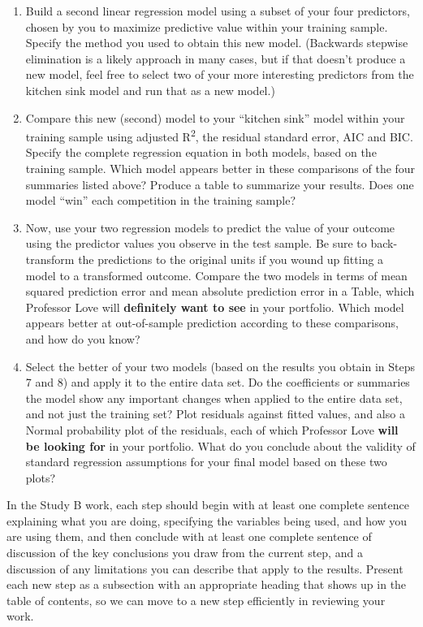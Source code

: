 \documentclass[]{book}
\begin{document}
\begin{enumerate}
\item
  Build a second linear regression model using a subset of your four predictors, chosen by you to maximize predictive value within your training sample. Specify the method you used to obtain this new model. (Backwards stepwise elimination is a likely approach in many cases, but if that doesn't produce a new model, feel free to select two of your more interesting predictors from the kitchen sink model and run that as a new model.)
\item
  Compare this new (second) model to your ``kitchen sink'' model within your training sample using adjusted R\textsuperscript{2}, the residual standard error, AIC and BIC. Specify the complete regression equation in both models, based on the training sample. Which model appears better in these comparisons of the four summaries listed above? Produce a table to summarize your results. Does one model ``win'' each competition in the training sample?
\item
  Now, use your two regression models to predict the value of your outcome using the predictor values you observe in the test sample. Be sure to back-transform the predictions to the original units if you wound up fitting a model to a transformed outcome. Compare the two models in terms of mean squared prediction error and mean absolute prediction error in a Table, which Professor Love will \textbf{definitely want to see} in your portfolio. Which model appears better at out-of-sample prediction according to these comparisons, and how do you know?
\item
  Select the better of your two models (based on the results you obtain in Steps 7 and 8) and apply it to the entire data set. Do the coefficients or summaries the model show any important changes when applied to the entire data set, and not just the training set? Plot residuals against fitted values, and also a Normal probability plot of the residuals, each of which Professor Love \textbf{will be looking for} in your portfolio. What do you conclude about the validity of standard regression assumptions for your final model based on these two plots?
\end{enumerate}

In the Study B work, each step should begin with at least one complete sentence explaining what you are doing, specifying the variables being used, and how you are using them, and then conclude with at least one complete sentence of discussion of the key conclusions you draw from the current step, and a discussion of any limitations you can describe that apply to the results. Present each new step as a subsection with an appropriate heading that shows up in the table of contents, so we can move to a new step efficiently in reviewing your work.
\end{document}
